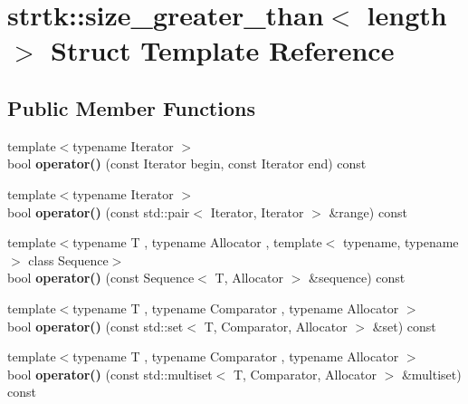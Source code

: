 \hypertarget{structstrtk_1_1size__greater__than}{\section{strtk\-:\-:size\-\_\-greater\-\_\-than$<$ length $>$ Struct Template Reference}
\label{structstrtk_1_1size__greater__than}
}
\subsection*{Public Member Functions}
\begin{DoxyCompactItemize}
\item 
\hypertarget{structstrtk_1_1size__greater__than_af8b90d446bc81ec52ec2475a477f6b81}{{\footnotesize template$<$typename Iterator $>$ }\\bool {\bfseries operator()} (const Iterator begin, const Iterator end) const }\label{structstrtk_1_1size__greater__than_af8b90d446bc81ec52ec2475a477f6b81}

\item 
\hypertarget{structstrtk_1_1size__greater__than_adf872fea8543c12ff3624b865d684c27}{{\footnotesize template$<$typename Iterator $>$ }\\bool {\bfseries operator()} (const std\-::pair$<$ Iterator, Iterator $>$ \&range) const }\label{structstrtk_1_1size__greater__than_adf872fea8543c12ff3624b865d684c27}

\item 
\hypertarget{structstrtk_1_1size__greater__than_a496f8102089b1d37edd29af0f1135b6e}{{\footnotesize template$<$typename T , typename Allocator , template$<$ typename, typename $>$ class Sequence$>$ }\\bool {\bfseries operator()} (const Sequence$<$ T, Allocator $>$ \&sequence) const }\label{structstrtk_1_1size__greater__than_a496f8102089b1d37edd29af0f1135b6e}

\item 
\hypertarget{structstrtk_1_1size__greater__than_a40dadc239dd400ab061b9456a59945ca}{{\footnotesize template$<$typename T , typename Comparator , typename Allocator $>$ }\\bool {\bfseries operator()} (const std\-::set$<$ T, Comparator, Allocator $>$ \&set) const }\label{structstrtk_1_1size__greater__than_a40dadc239dd400ab061b9456a59945ca}

\item 
\hypertarget{structstrtk_1_1size__greater__than_a0af071497eaa79c410b178f821f8a154}{{\footnotesize template$<$typename T , typename Comparator , typename Allocator $>$ }\\bool {\bfseries operator()} (const std\-::multiset$<$ T, Comparator, Allocator $>$ \&multiset) const }\label{structstrtk_1_1size__greater__than_a0af071497eaa79c410b178f821f8a154}


\end{DoxyCompactItemize}
